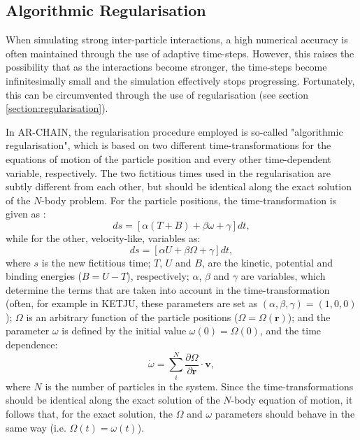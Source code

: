 \documentclass[english, twoside]{HYgradu}
\begin{document}
\subsection{Algorithmic Regularisation}

When simulating strong inter-particle interactions, a high numerical accuracy is often maintained through the use of adaptive time-steps. However, this raises the possibility that as the interactions become stronger, the time-steps become infinitesimally small and the simulation effectively stops progressing. Fortunately, this can be circumvented through the use of regularisation (see section \ref{section:regularisation}). 

In AR-CHAIN, the regularisation procedure employed is so-called "algorithmic regularisation", which is based on two different time-transformations for the equations of motion of the particle position and every other time-dependent variable, respectively. The two fictitious times used in the regularisation are subtly different from each other, but should be identical along the exact solution of the $N$-body problem. For the particle positions, the time-transformation is given as \citep{Mikkola2008ARCHAIN}:
\begin{equation}
ds = [ \alpha ( T+B ) + \beta \omega + \gamma ] dt, \label{eq:ds_coords}
\end{equation}
while for the other, velocity-like, variables as:
\begin{equation}
ds = [\alpha U + \beta \Omega + \gamma] dt, \label{eq:ds_vels}
\end{equation}
where $s$ is the new fictitious time; $T$, $U$ and $B$, are the kinetic, potential and binding energies ($B = U - T$), respectively; $\alpha$, $\beta$ and $\gamma$ are variables, which determine the terms that are taken into account in the time-transformation (often, for example in KETJU, these parameters are set as $(\alpha, \beta, \gamma) = (1, 0, 0)$); $\Omega$ is an arbitrary function of the particle positions ($\Omega = \Omega(\mathbf{r})$); and the parameter $\omega$ is defined by the initial value $\omega(0) = \Omega(0)$, and the time dependence:
\begin{equation}
\dot{\omega} = \displaystyle\sum^N_i \frac{\partial \Omega}{\partial \mathbf{r}} \cdot \mathbf{v},
\end{equation}
where $N$ is the number of particles in the system. Since the time-transformations should be identical along the exact solution of the $N$-body equation of motion, it follows that, for the exact solution, the $\Omega$ and $\omega$ parameters should behave in the same way (i.e. $\Omega(t) = \omega(t)$). 
\end{document}
